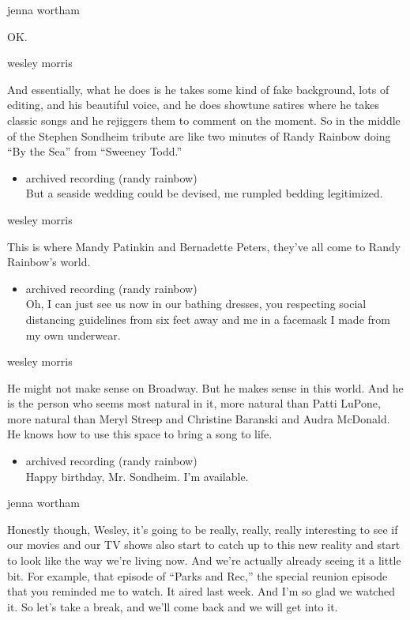 jenna wortham

OK.

wesley morris

And essentially, what he does is he takes some kind of fake background,
lots of editing, and his beautiful voice, and he does showtune satires
where he takes classic songs and he rejiggers them to comment on the
moment. So in the middle of the Stephen Sondheim tribute are like two
minutes of Randy Rainbow doing ``By the Sea'' from ``Sweeney Todd.''

\begin{itemize}
\tightlist
\item
  archived recording (randy rainbow)\\
  But a seaside wedding could be devised, me rumpled bedding
  legitimized.
\end{itemize}

wesley morris

This is where Mandy Patinkin and Bernadette Peters, they've all come to
Randy Rainbow's world.

\begin{itemize}
\tightlist
\item
  archived recording (randy rainbow)\\
  Oh, I can just see us now in our bathing dresses, you respecting
  social distancing guidelines from six feet away and me in a facemask I
  made from my own underwear.
\end{itemize}

wesley morris

He might not make sense on Broadway. But he makes sense in this world.
And he is the person who seems most natural in it, more natural than
Patti LuPone, more natural than Meryl Streep and Christine Baranski and
Audra McDonald. He knows how to use this space to bring a song to life.

\begin{itemize}
\tightlist
\item
  archived recording (randy rainbow)\\
  Happy birthday, Mr. Sondheim. I'm available.
\end{itemize}

jenna wortham

Honestly though, Wesley, it's going to be really, really, really
interesting to see if our movies and our TV shows also start to catch up
to this new reality and start to look like the way we're living now. And
we're actually already seeing it a little bit. For example, that episode
of ``Parks and Rec,'' the special reunion episode that you reminded me
to watch. It aired last week. And I'm so glad we watched it. So let's
take a break, and we'll come back and we will get into it.

